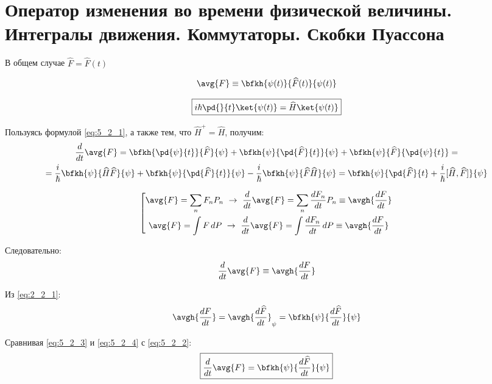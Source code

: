 \section{Оператор изменения во времени физической величины. Интегралы движения. Коммутаторы. Скобки Пуассона}

В общем случае $\widehat{F}=\widehat{F}(t)$

$$\avg{F}\equiv\bfkh{\psi(t)}{\widehat{F}(t)}{\psi(t)}$$

\begin{equation}
\label{eq:5_2_1}
\boxed{i\hbar\pd{}{t}\ket{\psi(t)}=\widehat{H}\ket{\psi(t)}}
\end{equation}

Пользуясь формулой \eqref{eq:5_2_1}, а также тем, что $\widehat{H}^+=\widehat{H}$, получим:
\begin{equation}
\begin{gathered}
\label{eq:5_2_2}
\frac{d}{dt} \avg{F} =\bfkh{\pd{\psi}{t}}{\widehat{F}}{\psi} + \bfkh{\psi}{\pd{\widehat{F}}{t}}{\psi} + \bfkh{\psi}{\widehat{F}}{\pd{\psi}{t}} = \\
= \frac{i}{\hbar}\bfkh{\psi}{\widehat{H}\widehat{F}}{\psi}+\bfkh{\psi}{\pd{\widehat{F}}{t}}{\psi}-\frac{i}{\hbar}\bfkh{\psi}{\widehat{F}\widehat{H}}{\psi} = \bfkh{\psi}{\pd{\widehat{F}}{t}+\frac{i}{\hbar}[\widehat{H},\widehat{F}]}{\psi}
\end{gathered}
\end{equation}

$$
\left[
\begin{gathered}
\avg{F} = \sum_n F_n P_n ~\rightarrow~ \frac{d}{dt}\avg{F}=\sum_n \frac{dF_n}{dt}P_n \equiv \avgh{\frac{dF}{dt}}\\
\avg{F} = \int F\,dP ~\rightarrow~ \frac{d}{dt}\avg{F}=\int \frac{dF_n}{dt}\,dP \equiv \avgh{\frac{dF}{dt}}\\
\end{gathered}
\right.
$$

Следовательно:
\begin{equation}
\label{eq:5_2_3}
\frac{d}{dt} \avg{F} \equiv \avgh{\frac{dF}{dt}}
\end{equation}

Из \eqref{eq:2_2_1}:
\begin{equation}
\label{eq:5_2_4}
\avgh{\frac{dF}{dt}} = \avgh{\frac{d \widehat{F}}{dt}}_{\psi} = \bfkh{\psi}{\frac{d \widehat{F}}{dt}}{\psi}
\end{equation}

Сравнивая \eqref{eq:5_2_3} и \eqref{eq:5_2_4} с \eqref{eq:5_2_2}:
\begin{equation}
\label{eq:5_2_5}
\boxed{\frac{d}{dt} \avg{F} = \bfkh{\psi}{\frac{d \widehat{F}}{dt}}{\psi}}
\end{equation}

